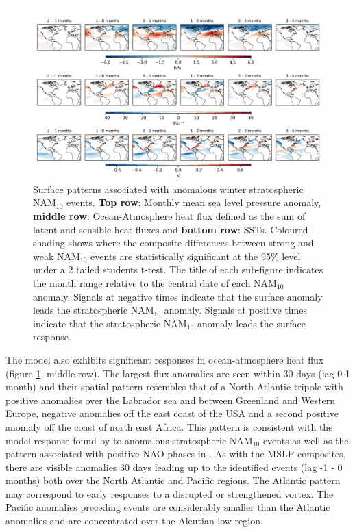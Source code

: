 \begin{center}
\begin{figure}[h!]
\noindent\includegraphics[width = \linewidth]{Figures/Figures-surface/in_season_response_NAM_combined.png}
\caption{Surface patterns associated with anomalous winter stratospheric NAM$_{10}$ events. \textbf{Top row}: Monthly mean sea level pressure anomaly, \textbf{middle row}: Ocean-Atmosphere heat flux defined as the sum of latent and sensible heat fluxes and \textbf{bottom row}: SSTs. Coloured shading shows where the composite differences between strong and weak NAM$_{10}$ events are statistically significant at the 95\% level under a 2 tailed students t-test. The title of each sub-figure indicates the month range relative to the central date of each NAM$_{10}$ anomaly. Signals at negative times indicate that the surface anomaly leads the stratospheric NAM$_{10}$ anomaly. Signals at positive  times indicate that the stratospheric NAM$_{10}$ anomaly leads the surface response.}
\label{surface_comp_all}
\end{figure}
\end{center}

The model also exhibits significant responses in ocean-atmosphere heat flux (figure \ref{surface_comp_all}, middle row). The largest flux anomalies are seen within 30 days (lag 0-1 month) and their spatial pattern resembles that of a North Atlantic tripole with positive anomalies over the Labrador sea and between Greenland and Western Europe, negative anomalies off the east coast of the USA and a second positive anomaly off the coast of north east Africa. This pattern is consistent with the model response found by \cite{reichlerStratospheric2012} to anomalous stratospheric NAM$_{10}$ events as well as the pattern associated with positive NAO phases in \cite{delworthImpact2016}. As with the MSLP composites, there are visible anomalies 30 days leading up to the identified events (lag -1 - 0 months) both over the North Atlantic and Pacific regions. The Atlantic pattern may correspond to early responses to a disrupted or strengthened vortex. The Pacific anomalies preceding events are considerably smaller than the Atlantic anomalies and are concentrated over the Aleutian low region.

